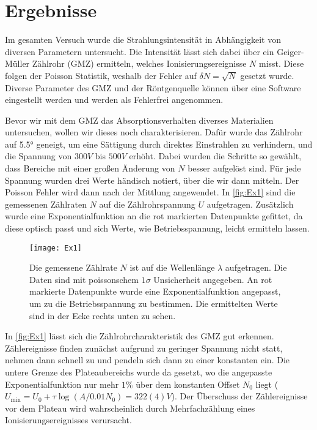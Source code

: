 \section{Ergebnisse}
Im gesamten Versuch wurde die Strahlungsintensität in Abhängigkeit von diversen Parametern untersucht. Die Intensität lässt sich dabei über ein Geiger-Müller Zählrohr (GMZ) ermitteln, welches Ionisierungsereignisse \( N \) misst. Diese folgen der Poisson Statistik, weshalb der Fehler auf \( \delta N = \sqrt{N} \) gesetzt wurde. Diverse Parameter des GMZ und der Röntgenquelle können über eine Software eingestellt werden und werden als Fehlerfrei angenommen. 

Bevor wir mit dem GMZ das Absorptionsverhalten diverses Materialien untersuchen, wollen wir dieses noch charakterisieren. Dafür wurde das Zählrohr auf \ang{5.5} geneigt, um eine Sättigung durch direktes Einstrahlen zu verhindern, und die Spannung von \( 300 \unit{V} \) bis \( 500 \unit{V} \) erhöht. Dabei wurden die Schritte so gewählt, dass Bereiche mit einer großen Änderung von \( N \) besser aufgelöst sind. Für jede Spannung wurden drei Werte händisch notiert, über die wir dann mitteln. Der Poisson Fehler wird dann nach der Mittlung angewendet. In \autoref{fig:Ex1} sind die gemessenen Zählraten $N$ auf die Zählrohrspannung $U$ aufgetragen. Zusätzlich wurde eine Exponentialfunktion an die rot markierten Datenpunkte gefittet, da diese optisch passt und sich Werte, wie Betriebsspannung, leicht ermitteln lassen.

\begin{figure}[H]
	\centering
	\texttt{[image: Ex1]}
	\caption{Die gemessene Zählrate \( N \) ist auf die Wellenlänge \( \lambda \) aufgetragen. Die Daten sind mit poissonschem \( 1\sigma \) Unsicherheit angegeben. An rot markierte Datenpunkte wurde eine Exponentialfunktion angepasst, um zu die Betriebsspannung zu bestimmen. Die ermittelten Werte sind in der Ecke rechts unten zu sehen.}
	\label{fig:Ex1}
\end{figure}

In \autoref{fig:Ex1} lässt sich die Zählrohrcharakteristik des GMZ gut erkennen. Zählereignisse finden zunächst aufgrund zu geringer Spannung nicht statt, nehmen dann schnell zu und pendeln sich dann zu einer konstanten ein. Die untere Grenze des Plateaubereichs wurde da gesetzt, wo die angepasste Exponentialfunktion nur mehr \( 1\% \) über dem konstanten Offset \( N_0 \) liegt (\( U_{\text{min}} = U_0 + \tau\log\left( A/0.01N_0 \right) = 322(4) \unit{V} \)). Der Überschuss der Zählereignisse vor dem Plateau wird wahrscheinlich durch Mehrfachzählung eines Ionisierungsereignisses verursacht. 

